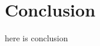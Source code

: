 \documentclass[journal]{IEEEtran}
\begin{document}
\section{Conclusion}
here is conclusion

\ifCLASSOPTIONcaptionsoff
  \newpage
\fi

  


  
  
\end{document}
